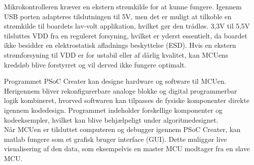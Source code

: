 Mikrokontrolleren kræver en ekstern strømkilde for at kunne fungere. Igennem USB porten adapteres tilslutningen til 5V, men det er muligt at tilkoble en strømkilde til boardets lav-volt applikation, hvilket gør den trådløs. 3,3V til 5,5V tilsluttes VDD fra en reguleret forsyning, hvilket er yderst essentielt, da boardet ikke besidder en elektrostatisk afladnings beskyttelse (ESD). Hvis en ekstern strømforsyning til VDD er for ustabil eller af dårlig kvalitet, kan MCUens kredsløb blive forstyrret og vil derved ikke fungere optimalt. \citep{Semiconductor2016}

Programmet PSoC Creater kan designe hardware og software til MCUen. Herigennem bliver rekonfigurerbare analoge blokke og digital programmerbar logik kombineret, hvorved softwaren kan tilpasses de fysiske komponenter direkte igennem kodedesign. Programmet indeholder forskellige komponenter og kodeeksempler, hvilket kan blive behjælpeligt under algoritmedesignet. \citep{Semiconductor2016} \\
Når MCUen er tilsluttet computeren og debugger igennem PSoC Creater, kan matlab fungere som et grafisk bruger interface (GUI). Dette muliggør live visualisering af den data, som eksempelvis en master MCU modtager fra en slave MCU.

